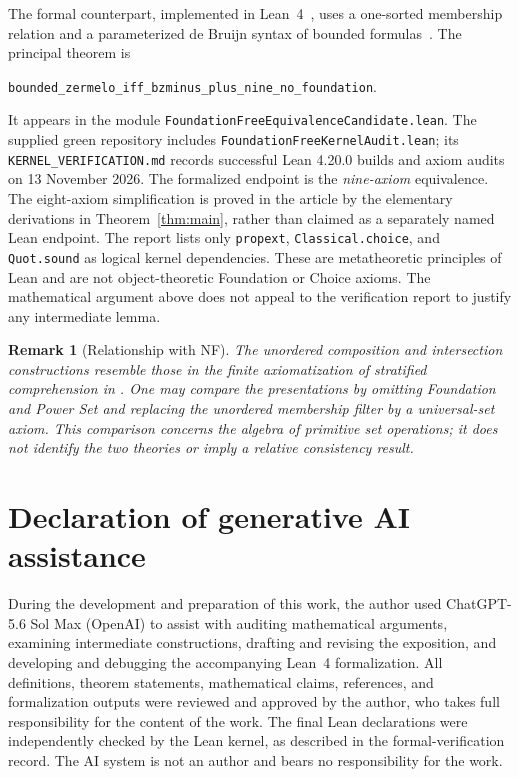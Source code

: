 \documentclass[11pt,a4paper]{article}
\numberwithin{equation}{section}
\newtheorem{remark}[theorem]{Remark}
\begin{document}
The formal counterpart, implemented in Lean~4~\cite{Lean4}, uses a one-sorted membership relation and a parameterized de Bruijn syntax of bounded formulas~\cite{deBruijn1972}.  The principal theorem is
\begin{center}
\small\nolinkurl{bounded_zermelo_iff_bzminus_plus_nine_no_foundation}.
\end{center}
It appears in the module \nolinkurl{FoundationFreeEquivalenceCandidate.lean}.  The supplied green repository includes \nolinkurl{FoundationFreeKernelAudit.lean}; its \nolinkurl{KERNEL_VERIFICATION.md} records successful Lean 4.20.0 builds and axiom audits on 13 November 2026.  The formalized endpoint is the \emph{nine-axiom} equivalence.  The eight-axiom simplification is proved in the article by the elementary derivations in Theorem~\ref{thm:main}, rather than claimed as a separately named Lean endpoint.  The report lists only \texttt{propext}, \texttt{Classical.choice}, and \texttt{Quot.sound} as logical kernel dependencies.  These are metatheoretic principles of Lean and are not object-theoretic Foundation or Choice axioms.  The mathematical argument above does not appeal to the verification report to justify any intermediate lemma.

\begin{remark}[Relationship with NF]
The unordered composition and intersection constructions resemble those in the finite axiomatization of stratified comprehension in \cite{AlJohar2020}.  One may compare the presentations by omitting Foundation and Power Set and replacing the unordered membership filter by a universal-set axiom.  This comparison concerns the \emph{algebra of primitive set operations}; it does not identify the two theories or imply a relative consistency result.
\end{remark}

\section*{Declaration of generative AI assistance}

During the development and preparation of this work, the author used
ChatGPT-5.6 Sol Max (OpenAI) to assist with auditing mathematical
arguments, examining intermediate constructions, drafting and revising
the exposition, and developing and debugging the accompanying Lean~4
formalization. All definitions, theorem statements, mathematical claims,
references, and formalization outputs were reviewed and approved by the
author, who takes full responsibility for the content of the work. The
final Lean declarations were independently checked by the Lean kernel,
as described in the formal-verification record. The AI system is not an
author and bears no responsibility for the work.
\end{document}
